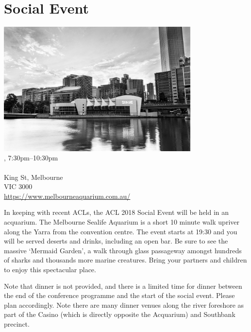 \clearpage
\section{Social Event}
\setheaders{}{\daydateyear}

\begin{center}

\includegraphics[width=4in]{day2/aquarium.jpg} \\


\daydateyear, 7:30pm--10:30pm \vspace{1em}\\
\SocialLoc\\
King St, Melbourne \\
VIC 3000 \\
\url{https://www.melbourneaquarium.com.au/}
\end{center}

In keeping with recent ACLs, the ACL 2018 Social Event will be held in an
acquarium.  The Melbourne Sealife Aquarium is a short 10 minute walk upriver
along the Yarra from the convention centre. The event starts at 19:30 and you
will be served deserts and drinks, including an open bar.  Be sure to see the
massive `Mermaid Garden', a walk through glass passageway amongst hundreds of
sharks and thousands more marine creatures. Bring your partners and children 
to enjoy this spectacular place.

Note that dinner is not provided, and there is a limited time for dinner
between the end of the conference programme and the start of the social event.
Please plan accordingly.  Note there are many dinner venues along the river
foreshore as part of the Casino (which is directly opposite the Acquarium) and
Southbank precinct.
